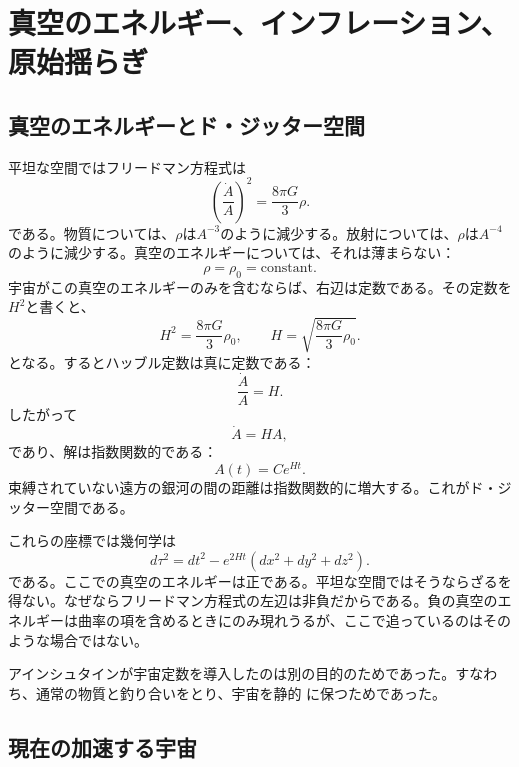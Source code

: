 \chapter{真空のエネルギー、インフレーション、原始揺らぎ}

\section{真空のエネルギーとド・ジッター空間}

平坦な空間ではフリードマン方程式は
\begin{equation}
\left(\frac{\dot A}{A}\right)^2=\frac{8\pi G}{3}\rho.
\end{equation}
である。物質については、\(\rho\)は\(A^{-3}\)のように減少する。放射については、\(\rho\)は\(A^{-4}\)のように減少する。真空のエネルギーについては、それは薄まらない：
\begin{equation}
\rho=\rho_0=\text{constant}.
\end{equation}
宇宙がこの真空のエネルギーのみを含むならば、右辺は定数である。その定数を\(H^2\)と書くと、
\begin{equation}
H^2=\frac{8\pi G}{3}\rho_0,
\qquad
H=\sqrt{\frac{8\pi G}{3}\rho_0}.
\end{equation}
となる。するとハッブル定数は真に定数である：
\begin{equation}
\frac{\dot A}{A}=H.
\end{equation}
したがって
\begin{equation}
\dot A=HA,
\end{equation}
であり、解は指数関数的である：
\begin{equation}
A(t)=C e^{Ht}.
\end{equation}
束縛されていない遠方の銀河の間の距離は指数関数的に増大する。これがド・ジッター空間である。

これらの座標では幾何学は
\begin{equation}
d\tau^2=dt^2-e^{2Ht}\left(dx^2+dy^2+dz^2\right).
\end{equation}
である。ここでの真空のエネルギーは正である。平坦な空間ではそうならざるを得ない。なぜならフリードマン方程式の左辺は非負だからである。負の真空のエネルギーは曲率の項を含めるときにのみ現れうるが、ここで追っているのはそのような場合ではない。

アインシュタインが宇宙定数を導入したのは別の目的のためであった。すなわち、通常の物質と釣り合いをとり、宇宙を静的 に保つためであった。

\section{現在の加速する宇宙}

